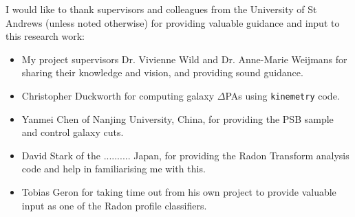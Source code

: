 
I would like to thank supervisors and colleagues from the University of St Andrews (unless noted otherwise) for providing valuable guidance and input to this research work:
\begin{itemize}
    \item My project supervisors Dr. Vivienne Wild and Dr. Anne-Marie Weijmans for sharing their knowledge and vision, and providing sound guidance. 
    \item Christopher Duckworth for computing galaxy $\Delta$PAs using \texttt{kinemetry} code.
    \item Yanmei Chen of Nanjing University, China, for providing the PSB sample and control galaxy cuts.
    \item David Stark of the .......... Japan, for providing the Radon Transform analysis code and help in familiarising me with this.
    \item Tobias Geron for taking time out from his own project to provide valuable input as one of the Radon profile classifiers.
\end{itemize}
